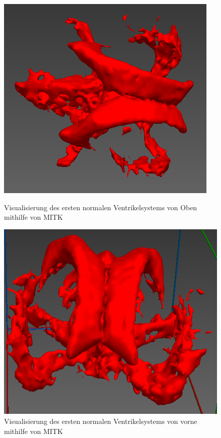 \begin{figure}[h]
\begin{minipage}[b]{.5\textwidth}
  \centering
  \includegraphics[width=.9\linewidth, height=.9\linewidth]{Logos/Normal1_MITK/Oben.PNG}
  \caption{Visualisierung des ersten normalen Ventrikelsystems von Oben mithilfe von MITK}
  \label{fig:mitk_o}
\end{minipage}%
\begin{minipage}[b]{.5\textwidth}
  \centering
  \includegraphics[width=.9\linewidth, height=.9\linewidth]{Logos/Normal1_MITK/Schraeg_Vorne.PNG}
  \caption{Visualisierung des ersten normalen Ventrikelsystems von vorne mithilfe von MITK}
  \label{fig:mitk_v}
\end{minipage}
\end{figure}


